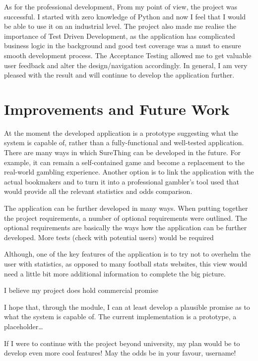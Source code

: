 As for the professional development, From my point of view, the project was successful. I started with zero knowledge of Python and now I feel that I would be able to use it on an industrial level. The project also made me realise the importance of Test Driven Development, as the application has complicated business logic in the background and good test coverage was a must to ensure smooth development process. The Acceptance Testing allowed me to get valuable user feedback and alter the design/navigation accordingly. In general, I am very pleased with the result and will continue to develop the application further.

\section{Improvements and Future Work}
\label{sec:enchancement_conclusion}
At the moment the developed application is a prototype suggesting what the system is capable of, rather than a fully-functional and well-tested application. 
There are many ways in which SureThing can be developed in the future. For example, it can remain a self-contained game and become a replacement to the real-world gambling experience. Another option is to link the application with the actual bookmakers and to turn it into a professional gambler's tool used that would provide all the relevant statistics and odds comparison.

The application can be further developed in many ways.  
When putting together the project requirements, a number of optional requirements were outlined. The optional requirements are basically the ways how the application can be further developed. More tests (check with potential users) would be required

Although, one of the key features of the application is to try not to overhelm the user with statistics, as opposed to many football stats websites, this view would need a little bit more additional information to complete the big picture. 


 I believe my project does hold commercial promise
 
 I hope that, through the module, I can at least develop a plausible promise as to what the system is capable of. The current implementation is a prototype, a placeholder… 
 
 If I were to continue with the project beyond university, my plan would be to develop even more cool features! May the odds be in your favour, username!
